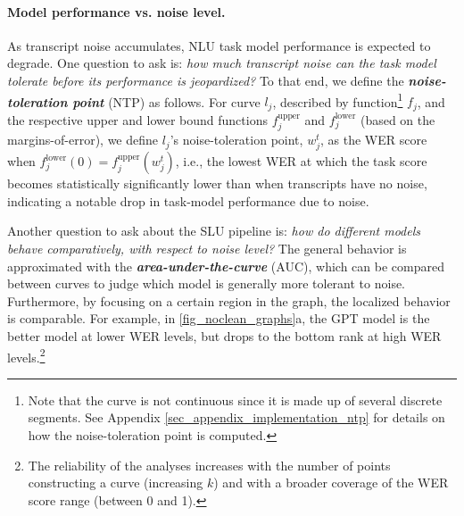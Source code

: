 \paragraph{Model performance vs. noise level.}
As transcript noise accumulates, NLU task model performance is expected to degrade.
One question to ask is: \textit{how much transcript noise can the task model tolerate before its performance is jeopardized?} To that end, we define the \textbf{\textit{noise-toleration point}} (NTP) as follows. For curve $l_j$, described by function\footnote{Note that the curve is not continuous since it is made up of several discrete segments. See Appendix \ref{sec_appendix_implementation_ntp} for details on how the noise-toleration point is computed.} $f_j$, and the respective upper and lower bound functions $f_j^{\text{upper}}$ and $f_j^{\text{lower}}$ (based on the margins-of-error), we define $l_j$'s noise-toleration point, $w^t_j$, as the WER score when $f_j^{\text{lower}}(0) = f_j^{\text{upper}}(w^t_j)$, i.e., 
the lowest WER at which the task score becomes statistically significantly lower than when transcripts have no noise, indicating a notable drop in task-model performance due to noise.

Another question to ask about the SLU pipeline is: \textit{how do different models behave comparatively, with respect to noise level?} The general behavior is approximated with the \textbf{\textit{area-under-the-curve}} (AUC), which can be compared between curves to judge which model is generally more tolerant to noise. Furthermore, by focusing on a certain region in the graph, the localized behavior is comparable. For example, in \autoref{fig_noclean_graphs}a, the GPT model is the better model at lower WER levels, but drops to the bottom rank at high WER levels.\footnote{The reliability of the analyses increases with the number of points constructing a curve (increasing $k$) and with a broader coverage of the WER score range (between 0 and 1).}

